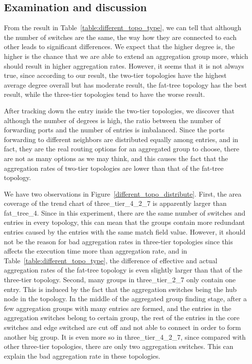 \subsection{Examination and discussion}
\label{examination_and_discussion}
From the result in Table~\ref{table:different_topo_type}, we can tell that although the number of switches are the same, the way how they are connected to each other leads to significant differences. We expect that the higher degree is, the higher is the chance that we are able to extend an aggregation group more, which should result in higher aggregation rates. However, it seems that it is not always true, since according to our result, the two-tier topologies have the highest average degree overall but has moderate result, the fat-tree topology has the best result, while the three-tier topologies tend to have the worse result. 

After tracking down the entry inside the two-tier topologies, we discover that although the number of degrees is high, the ratio between the number of forwarding ports and the number of entries is imbalanced. Since the ports forwarding to different neighbors are distributed equally among entries, and in fact, they are the real routing options for an aggregated group to choose, there are not as many options as we may think, and this\sout{} causes the fact that the aggregation rates of two-tier topologies are lower than that of the fat-tree topology. 

We have two observations in Figure~\ref{different_topo_distribute}. First, the area coverage of the trend chart of three\_tier\_4\_2\_7 is apparently larger than fat\_tree\_4. Since in this experiment, there are the same number of switches and entries in every topology, this can mean that the groups contain more redundant entries caused by the entries with the same match field value. However, it should not be the reason for bad aggregation rates in three-tier topologies since this affects the execution time more than aggregation rate, and in Table~\ref{table:different_topo_type}, the difference of effective and actual aggregation rates of the fat-tree topology is even slightly larger than that of the three-tier topology. Second, many groups in three\_tier\_2\_7 only contain one entry. This is induced by the fact that the aggregation switches being the hub node in the topology. In the middle of the aggregated group finding stage, after a few aggregation groups with many entries are formed, and the entries in the aggregation switches belong to certain group, the rest of the entries in the core switches and edge switched are cut off and not able to connect in order to form another big group. It is even more so in three\_tier\_4\_2\_7, since compared with other three-tier topologies, there are only two aggregation switches. This can explain the bad aggregation rate in these topologies.

